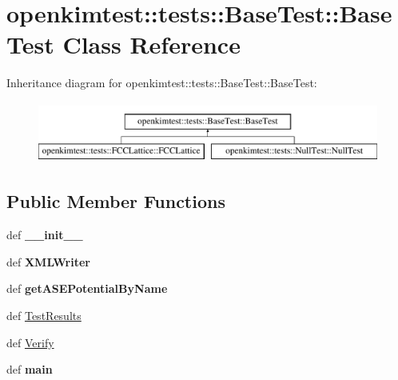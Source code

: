 \hypertarget{classopenkimtest_1_1tests_1_1BaseTest_1_1BaseTest}{
\section{openkimtest::tests::BaseTest::BaseTest Class Reference}
\label{classopenkimtest_1_1tests_1_1BaseTest_1_1BaseTest}
}
Inheritance diagram for openkimtest::tests::BaseTest::BaseTest:\begin{figure}[H]
\begin{center}
\leavevmode
\includegraphics[height=2.000000cm]{classopenkimtest_1_1tests_1_1BaseTest_1_1BaseTest}
\end{center}
\end{figure}
\subsection*{Public Member Functions}
\begin{DoxyCompactItemize}
\item 
\hypertarget{classopenkimtest_1_1tests_1_1BaseTest_1_1BaseTest_a67dda430bde5c052fbad725a1e04dc40}{
def {\bfseries \_\-\_\-init\_\-\_\-}}
\label{classopenkimtest_1_1tests_1_1BaseTest_1_1BaseTest_a67dda430bde5c052fbad725a1e04dc40}

\item 
\hypertarget{classopenkimtest_1_1tests_1_1BaseTest_1_1BaseTest_a7a3481894eae91db4a49f2ea0b62e0da}{
def {\bfseries XMLWriter}}
\label{classopenkimtest_1_1tests_1_1BaseTest_1_1BaseTest_a7a3481894eae91db4a49f2ea0b62e0da}

\item 
\hypertarget{classopenkimtest_1_1tests_1_1BaseTest_1_1BaseTest_afedf548ef9ebd8d711bf2de51859ec8c}{
def {\bfseries getASEPotentialByName}}
\label{classopenkimtest_1_1tests_1_1BaseTest_1_1BaseTest_afedf548ef9ebd8d711bf2de51859ec8c}

\item 
def \hyperlink{classopenkimtest_1_1tests_1_1BaseTest_1_1BaseTest_af4b1163c8ce5a064732caf7f4ac8a9d2}{TestResults}
\item 
def \hyperlink{classopenkimtest_1_1tests_1_1BaseTest_1_1BaseTest_a585c4839595e8fb6775e1e602b3aed5c}{Verify}
\item 
\hypertarget{classopenkimtest_1_1tests_1_1BaseTest_1_1BaseTest_a0e1361634a08aeafebf02f484f6d586c}{
def {\bfseries main}}
\label{classopenkimtest_1_1tests_1_1BaseTest_1_1BaseTest_a0e1361634a08aeafebf02f484f6d586c}

\end{DoxyCompactItemize}
